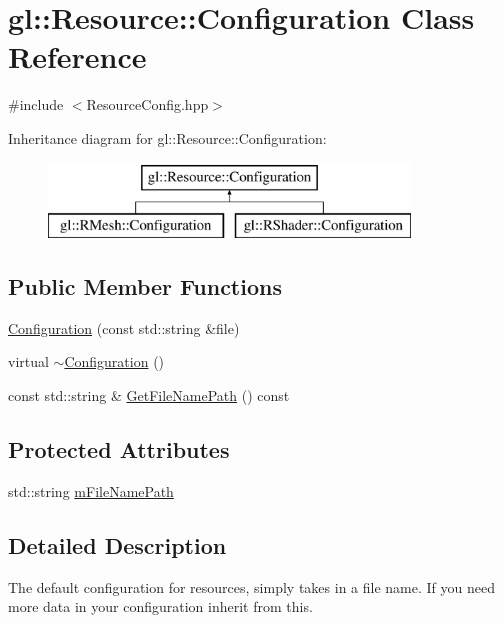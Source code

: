 \hypertarget{classgl_1_1_resource_1_1_configuration}{\section{gl\-:\-:Resource\-:\-:Configuration Class Reference}
\label{classgl_1_1_resource_1_1_configuration}
}


{\ttfamily \#include $<$Resource\-Config.\-hpp$>$}

Inheritance diagram for gl\-:\-:Resource\-:\-:Configuration\-:\begin{figure}[H]
\begin{center}
\leavevmode
\includegraphics[height=2.000000cm]{classgl_1_1_resource_1_1_configuration}
\end{center}
\end{figure}
\subsection*{Public Member Functions}
\begin{DoxyCompactItemize}
\item 
\hyperlink{classgl_1_1_resource_1_1_configuration_a876c1175b3e2ddb5ed8333ef3ac7847f}{Configuration} (const std\-::string \&file)
\item 
virtual \hyperlink{classgl_1_1_resource_1_1_configuration_a4197a0f13d1481193872a7944ada4a92}{$\sim$\-Configuration} ()
\item 
const std\-::string \& \hyperlink{classgl_1_1_resource_1_1_configuration_a04ed41f1159b66ab65f9affe296ee977}{Get\-File\-Name\-Path} () const 
\end{DoxyCompactItemize}
\subsection*{Protected Attributes}
\begin{DoxyCompactItemize}
\item 
std\-::string \hyperlink{classgl_1_1_resource_1_1_configuration_a97e9f99cea6b131ed086e1d74bbf282e}{m\-File\-Name\-Path}
\end{DoxyCompactItemize}


\subsection{Detailed Description}
The default configuration for resources, simply takes in a file name. If you need more data in your configuration inherit from this. 

